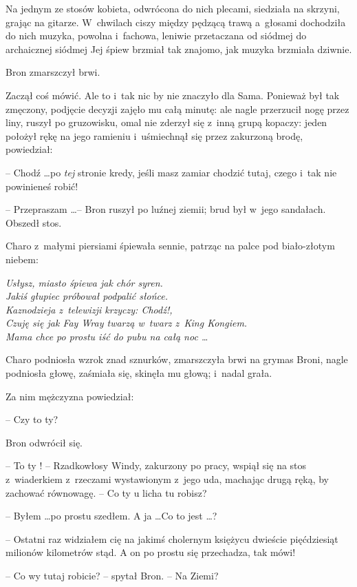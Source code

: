 \documentclass[oneside,polish,11pt,rmheadings]{mwbk}
\begin{document}
Na jednym ze stosów kobieta, odwrócona do nich plecami, siedziała na skrzyni, grając na gitarze. W~chwilach ciszy między pędzącą trawą a~głosami dochodziła do nich muzyka, powolna i~fachowa, leniwie przetaczana od siódmej do archaicznej  siódmej Jej śpiew brzmiał tak znajomo, jak muzyka brzmiała dziwnie. 

Bron zmarszczył brwi. 

Zaczął coś mówić. Ale to i~tak nic by nie znaczyło dla Sama. Ponieważ był tak zmęczony, podjęcie decyzji zajęło mu całą minutę: ale nagle przerzucił nogę przez liny, ruszył po gruzowisku, omal nie zderzył się z~inną grupą kopaczy: jeden położył rękę na jego ramieniu i~uśmiechnął się przez zakurzoną brodę, powiedział: 

-- Chodź \ldots  po \textit{tej }stronie kredy, jeśli masz zamiar chodzić tutaj, czego i~tak nie powinieneś robić! 

-- Przepraszam \ldots  -- Bron ruszył po luźnej ziemii; brud był w~jego sandałach. Obszedł stos. 

Charo z~małymi piersiami śpiewała sennie, patrząc na palce pod biało-złotym niebem: 

\noindent \textit{Usłysz, miasto śpiewa jak chór syren. \\ Jakiś głupiec próbował podpalić słońce. \\ Kaznodzieja z~telewizji krzyczy: Chodź!, \\ Czuję się jak Fay Wray twarzą w~twarz z~King Kongiem. \\Mama chce po prostu iść do pubu na całą noc  \ldots }

Charo podniosła wzrok znad sznurków, zmarszczyła brwi na grymas Broni, nagle podniosła głowę, zaśmiała się, skinęła mu głową; i~nadal grała. 

Za nim mężczyzna powiedział: 

-- Czy to ty?  

Bron odwrócił się. 

-- To ty ! -- Rzadkowłosy Windy, zakurzony po pracy, wspiął się na stos z~wiaderkiem z~rzeczami wystawionym z~jego uda, machając drugą ręką, by zachować równowagę. -- Co ty u licha tu robisz? 

-- Byłem \ldots   po prostu szedłem. A ja \ldots  Co to jest \ldots ? 

-- Ostatni raz widziałem cię na jakimś cholernym księżycu dwieście pięćdziesiąt milionów kilometrów stąd. A on po prostu się przechadza, tak mówi! 

-- Co wy tutaj robicie? -- spytał Bron. -- Na Ziemi? 
\end{document}
